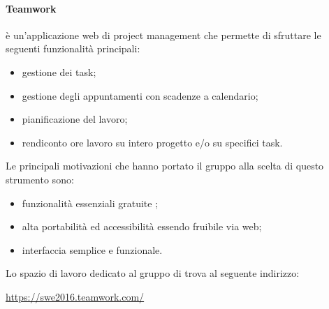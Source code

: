 		\paragraph{Teamwork}\label{sec:teamwork}
		 è un'applicazione web di project management che permette di sfruttare le seguenti funzionalità principali:
		\begin{itemize}
			\item gestione dei task;
			\item gestione degli appuntamenti con scadenze a calendario;
			\item pianificazione del lavoro;
			\item rendiconto ore lavoro su intero progetto e/o su specifici task.
		\end{itemize}
		Le principali motivazioni che hanno portato il gruppo alla scelta di questo strumento sono:
		\begin{itemize}
			\item funzionalità essenziali gratuite ;
			\item alta portabilità ed accessibilità essendo fruibile via web;
			\item interfaccia semplice e funzionale.
		\end{itemize}
		Lo spazio di lavoro dedicato al gruppo di trova al seguente indirizzo:
		\begin{center}
			\url{https://swe2016.teamwork.com/}
		\end{center}
